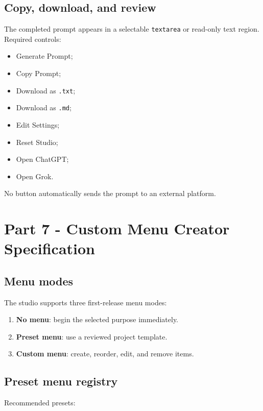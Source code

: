\documentclass[11pt,letterpaper]{article}
\begin{document}
\subsection{Copy, download, and review}

The completed prompt appears in a selectable \texttt{textarea} or read-only text
region. Required controls:

\begin{itemize}
    \item Generate Prompt;
    \item Copy Prompt;
    \item Download as \texttt{.txt};
    \item Download as \texttt{.md};
    \item Edit Settings;
    \item Reset Studio;
    \item Open ChatGPT;
    \item Open Grok.
\end{itemize}

No button automatically sends the prompt to an external platform.

\section{Part 7 - Custom Menu Creator Specification}

\subsection{Menu modes}

The studio supports three first-release menu modes:

\begin{enumerate}
    \item \textbf{No menu}: begin the selected purpose immediately.
    \item \textbf{Preset menu}: use a reviewed project template.
    \item \textbf{Custom menu}: create, reorder, edit, and remove items.
\end{enumerate}

\subsection{Preset menu registry}

Recommended presets:
\end{document}
